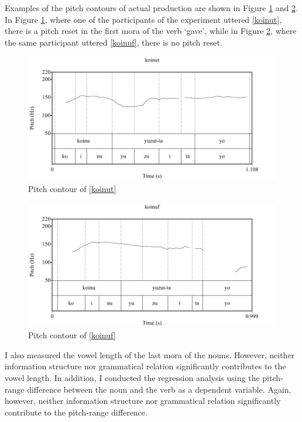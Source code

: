 Examples of the pitch contours of actual production are shown
in Figure \ref{Int:Fig:koinut} and \ref{Int:Fig:koinuf}.
In Figure \ref{Int:Fig:koinut},
where one of the participants of the experiment uttered \ref{koinut},
there is a pitch reset in the first mora of the verb  `gave',
while in Figure \ref{Int:Fig:koinuf},
where the same participant uttered \ref{koinuf},
there is no pitch reset.

\begin{figure}
	\begin{center}
		\includegraphics[width=.6\textwidth]{figure/pitcht.pdf}
	\end{center}
	\caption{Pitch contour of \ref{koinut}}
	\label{Int:Fig:koinut}
\end{figure}
\begin{figure}
	\begin{center}
		\includegraphics[width=.6\textwidth]{figure/pitchf.pdf}
	\end{center}
	\caption{Pitch contour of \ref{koinuf}}
	\label{Int:Fig:koinuf}
\end{figure}

I also measured the vowel length of the last mora of the nouns.
However, neither information structure nor grammatical relation significantly contributes to the vowel length.
In addition, I conducted the regression analysis
using the pitch-range difference between the noun and the verb as a dependent variable.
Again, however,
neither information structure nor grammatical relation significantly contribute to the pitch-range difference.


